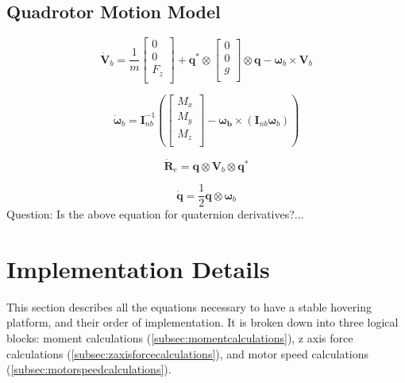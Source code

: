 \documentclass{article}
\numberwithin{equation}{section} %
\begin{document}
\subsection{Quadrotor Motion Model}

\begin{equation}
\dot{\boldsymbol{V}}_b = \frac{1}{m} 
	\left[
		\begin{array}{c}
			0 \\
			0 \\
			F_z \\
		\end{array}
	\right]
	+ \boldsymbol{q}^* \otimes
		\left[
			\begin{array}{c}
				0 \\
				0 \\
				g \\
			\end{array}
		\right]
	\otimes \boldsymbol{q} - \boldsymbol{\omega}_b \times \boldsymbol{V}_b
\end{equation}

\begin{equation}
\dot{\boldsymbol{\omega}}_b = \boldsymbol{I}^{-1}_{nb}
	\left(
		\left[
			\begin{array}{c}
				M_x \\
				M_y \\
				M_z \\
			\end{array}
		\right]
		- \boldsymbol{\omega_b} \times \left( \boldsymbol{I}_{nb} \boldsymbol{\omega}_b \right)
	\right)
\end{equation}

\begin{equation}
\dot{\boldsymbol{R}}_e = \boldsymbol{q} \otimes \boldsymbol{V}_b \otimes \boldsymbol{q}^*
\end{equation}

\begin{equation}
\dot{\boldsymbol{q}} = \frac{1}{2} \boldsymbol{q} \otimes \boldsymbol{\omega}_b
\end{equation}
Question: Is the above equation for quaternion derivatives?...


\section{Implementation Details}
This section describes all the equations necessary to have a stable hovering platform, and their order of implementation. It is broken down into three logical blocks: moment calculations (\ref{subsec:momentcalculations}), z axis force calculations (\ref{subsec:zaxisforcecalculations}), and motor speed calculations (\ref{subsec:motorspeedcalculations}). 
\end{document}

